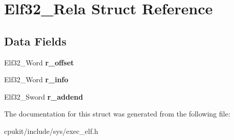\hypertarget{structElf32__Rela}{}\section{Elf32\+\_\+\+Rela Struct Reference}
\label{structElf32__Rela}
\subsection*{Data Fields}
\begin{DoxyCompactItemize}
\item 
\mbox{\label{structElf32__Rela_a25539ccb3dd308da3d178ab00fe18d1e}} 
Elf32\+\_\+\+Word {\bfseries r\+\_\+offset}
\item 
\mbox{\label{structElf32__Rela_ac3a79d3f04209c33ddb4c36d07e68a79}} 
Elf32\+\_\+\+Word {\bfseries r\+\_\+info}
\item 
\mbox{\label{structElf32__Rela_a1952286a900648afb9029c68a8bcea4d}} 
Elf32\+\_\+\+Sword {\bfseries r\+\_\+addend}
\end{DoxyCompactItemize}


The documentation for this struct was generated from the following file\+:\begin{DoxyCompactItemize}
\item 
cpukit/include/sys/exec\+\_\+elf.\+h\end{DoxyCompactItemize}
